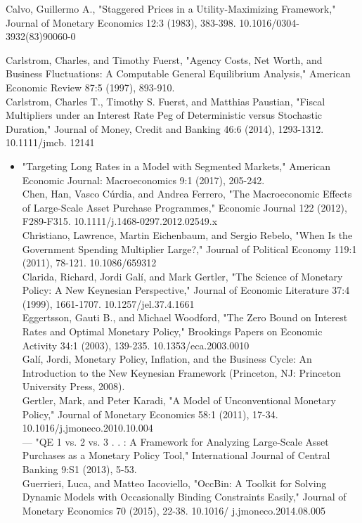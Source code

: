 \documentclass[10pt]{article}
\begin{document}
Calvo, Guillermo A., "Staggered Prices in a Utility-Maximizing Framework," Journal of Monetary Economics 12:3 (1983), 383-398. 10.1016/0304-3932(83)90060-0

Carlstrom, Charles, and Timothy Fuerst, "Agency Costs, Net Worth, and Business Fluctuations: A Computable General Equilibrium Analysis," American Economic Review 87:5 (1997), 893-910.\\
Carlstrom, Charles T., Timothy S. Fuerst, and Matthias Paustian, "Fiscal Multipliers under an Interest Rate Peg of Deterministic versus Stochastic Duration," Journal of Money, Credit and Banking 46:6 (2014), 1293-1312. 10.1111/jmcb. 12141

\begin{itemize}
  \item "Targeting Long Rates in a Model with Segmented Markets," American Economic Journal: Macroeconomics 9:1 (2017), 205-242.\\
Chen, Han, Vasco Cúrdia, and Andrea Ferrero, "The Macroeconomic Effects of Large-Scale Asset Purchase Programmes," Economic Journal 122 (2012), F289-F315. 10.1111/j.1468-0297.2012.02549.x\\
Christiano, Lawrence, Martin Eichenbaum, and Sergio Rebelo, "When Is the Government Spending Multiplier Large?," Journal of Political Economy 119:1 (2011), 78-121. 10.1086/659312\\
Clarida, Richard, Jordi Galí, and Mark Gertler, "The Science of Monetary Policy: A New Keynesian Perspective," Journal of Economic Literature 37:4 (1999), 1661-1707. 10.1257/jel.37.4.1661\\
Eggertsson, Gauti B., and Michael Woodford, "The Zero Bound on Interest Rates and Optimal Monetary Policy," Brookings Papers on Economic Activity 34:1 (2003), 139-235. 10.1353/eca.2003.0010\\
Galí, Jordi, Monetary Policy, Inflation, and the Business Cycle: An Introduction to the New Keynesian Framework (Princeton, NJ: Princeton University Press, 2008).\\
Gertler, Mark, and Peter Karadi, "A Model of Unconventional Monetary Policy," Journal of Monetary Economics 58:1 (2011), 17-34. 10.1016/j.jmoneco.2010.10.004\\
— "QE 1 vs. 2 vs. 3 . . : A Framework for Analyzing Large-Scale Asset Purchases as a Monetary Policy Tool," International Journal of Central Banking 9:S1 (2013), 5-53.\\
Guerrieri, Luca, and Matteo Iacoviello, "OccBin: A Toolkit for Solving Dynamic Models with Occasionally Binding Constraints Easily," Journal of Monetary Economics 70 (2015), 22-38. 10.1016/ j.jmoneco.2014.08.005
\end{itemize}
\end{document}
